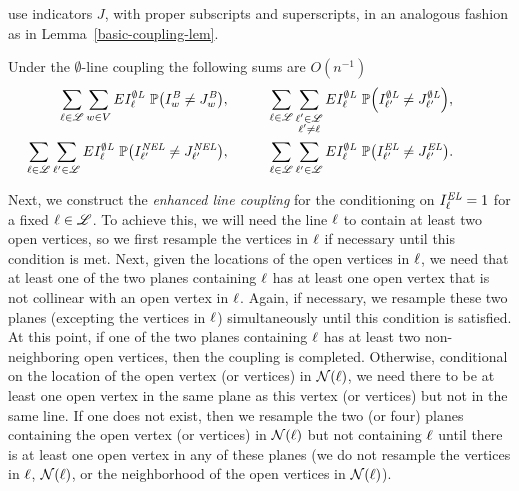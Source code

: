 use indicators $J$, with proper subscripts and superscripts, in an analogous fashion as in Lemma~\ref{basic-coupling-lem}.
\begin{lemma}
\label{ol-coupling-lem}
Under the $\emptyset$-line coupling the following sums are $O(n^{-1})$
\begin{align*}
\sum_{\Ln \in \lineset} \sum_{\vect{w}\in V} E\OL_\Ln\ \prob{\left(\B_{\vect{w}} \neq \JB_{\vect{w}}\right)}, & \hspace{1cm} 
\sum_{\Ln \in \lineset} \sum_{\substack{\Ln' \in \lineset\\ \Ln'\neq \Ln}} E\OL_\Ln\ \prob{\left(\OL_{\Ln'} \neq \JOL_{\Ln'}\right)},
\hspace{1cm}  \\
\sum_{\Ln \in \lineset} \sum_{\Ln' \in \lineset} E\OL_\Ln\ \prob{\left(\NEL_{\Ln'}\neq \JNEL_{\Ln'}\right)}, &\hspace{1cm} 
\sum_{\Ln \in \lineset} \sum_{\Ln' \in \lineset} E\OL_\Ln\ \prob{\left(\EL_{\Ln'} \neq \JEL_{\Ln'}\right)} .
\end{align*}
\end{lemma}

Next, we construct the {\em enhanced line coupling} for the conditioning on $I^{\text{\em EL}}_\ell = 1$ for a fixed $\ell \in \mathscr{L}$.  To achieve this, we will need the line $\ell$ to contain at least two open vertices, so we first resample the vertices in $\ell$ if necessary until this condition is met.  Next, given the locations of the open vertices in $\ell$, we need that at least one of the two planes containing $\ell$ has at least one open vertex that is not collinear with an open vertex in $\ell$.  Again, if necessary, we resample these two planes (excepting the vertices in $\ell$) simultaneously until this condition is satisfied.  At this point, if one of the two planes containing $\ell$ has at least  two non-neighboring open vertices, then the coupling is completed.  Otherwise, conditional on the location of the open vertex (or vertices) in $\mathcal{N}(\ell)$, we need there to be at least one open vertex in the same plane as this vertex (or vertices) but not in the same line.  If one does not exist, then we resample the two (or four) planes containing the open vertex (or vertices) in $\mathcal{N}(\ell)$ but not containing $\ell$ until there is at least one open vertex in any of these planes (we do not resample the vertices in $\ell$, $\mathcal{N}(\ell)$, or the neighborhood of the open vertices in $\mathcal{N}(\ell)$).

